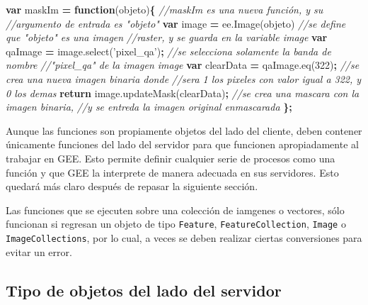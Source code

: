 \documentclass[
]{article}
\newenvironment{Shaded}{\begin{snugshade}}{\end{snugshade}}
\newcommand{\AttributeTok}[1]{\textcolor[rgb]{0.77,0.63,0.00}{#1}}
\newcommand{\CommentTok}[1]{\textcolor[rgb]{0.56,0.35,0.01}{\textit{#1}}}
\newcommand{\ControlFlowTok}[1]{\textcolor[rgb]{0.13,0.29,0.53}{\textbf{#1}}}
\newcommand{\DecValTok}[1]{\textcolor[rgb]{0.00,0.00,0.81}{#1}}
\newcommand{\KeywordTok}[1]{\textcolor[rgb]{0.13,0.29,0.53}{\textbf{#1}}}
\newcommand{\NormalTok}[1]{#1}
\newcommand{\OperatorTok}[1]{\textcolor[rgb]{0.81,0.36,0.00}{\textbf{#1}}}
\newcommand{\StringTok}[1]{\textcolor[rgb]{0.31,0.60,0.02}{#1}}
\newcommand{\VariableTok}[1]{\textcolor[rgb]{0.00,0.00,0.00}{#1}}
\begin{document}
\begin{Shaded}
\begin{Highlighting}[]
\KeywordTok{var}\NormalTok{ maskIm }\OperatorTok{=} \KeywordTok{function}\NormalTok{(objeto)}\OperatorTok{\{}              \CommentTok{//maskIm es una nueva función, y su }
\CommentTok{//argumento de entrada es "objeto"}
  \KeywordTok{var}\NormalTok{ image }\OperatorTok{=} \VariableTok{ee}\NormalTok{.}\AttributeTok{Image}\NormalTok{(objeto)              }\CommentTok{//se define que "objeto" es una imagen }
\CommentTok{//raster, y se guarda en la variable image}
  \KeywordTok{var}\NormalTok{ qaImage }\OperatorTok{=} \VariableTok{image}\NormalTok{.}\AttributeTok{select}\NormalTok{(}\StringTok{'pixel_qa'}\NormalTok{)}\OperatorTok{;}   \CommentTok{//se selecciona solamente la banda de nombre}
\CommentTok{//"pixel_qa" de la imagen image}
  \KeywordTok{var}\NormalTok{ clearData }\OperatorTok{=} \VariableTok{qaImage}\NormalTok{.}\AttributeTok{eq}\NormalTok{(}\DecValTok{322}\NormalTok{)}\OperatorTok{;}          \CommentTok{//se crea una nueva imagen binaria donde }
\CommentTok{//sera 1 los pixeles con valor igual a 322, y 0 los demas}
  \ControlFlowTok{return} \VariableTok{image}\NormalTok{.}\AttributeTok{updateMask}\NormalTok{(clearData)}\OperatorTok{;}       \CommentTok{//se crea una mascara con la imagen binaria,}
\CommentTok{//y se entreda la imagen original enmascarada}
\OperatorTok{\};}
\end{Highlighting}
\end{Shaded}

Aunque las funciones son propiamente objetos del lado del cliente, deben
contener únicamente funciones del lado del servidor para que funcionen
apropiadamente al trabajar en GEE. Esto permite definir cualquier serie
de procesos como una función y que GEE la interprete de manera adecuada
en sus servidores. Esto quedará más claro después de repasar la
siguiente sección.

\begin{tipblock}
Las funciones que se ejecuten sobre una colección de iamgenes o
vectores, sólo funcionan si regresan un objeto de tipo \texttt{Feature},
\texttt{FeatureCollection}, \texttt{Image} o \texttt{ImageCollections},
por lo cual, a veces se deben realizar ciertas conversiones para evitar
un error.

\end{tipblock}

\hypertarget{tipo-de-objetos-del-lado-del-servidor}{%
\subsection{Tipo de objetos del lado del
servidor}\label{tipo-de-objetos-del-lado-del-servidor}}
\end{document}
